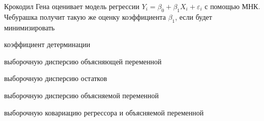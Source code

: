 
\begin{question}
Крокодил Гена оценивает модель регрессии
\(Y_i = \beta_0 + \beta_1 X_i + \varepsilon_i\) с помощью МНК. Чебурашка
получит такую же оценку коэффициента \(\beta_1\), если будет
минимизировать
\begin{answerlist}
  \item коэффициент детерминации
  \item выборочную дисперсию объясняющей переменной
  \item выборочную дисперсию остатков
  \item выборочную дисперсию объясняемой переменной
  \item выборочную ковариацию регрессора и объясняемой переменной
\end{answerlist}
\end{question}


